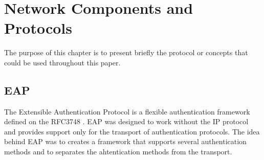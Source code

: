 
\chapter{Network Components and Protocols} %

\label{Chapter3} %


The purpose of this chapter is to present briefly the protocol or concepts that could be used throughout this paper.
\section{EAP}
The Extensible Authentication Protocol is a flexible authentication framework defined on the RFC3748 \cite{rfc3748}. EAP was designed to work without the IP protocol and provides support only for the transport of authentication protocols. The idea behind EAP was to creates a framework that supports several authentication methods and to separates the ahtentication methods from the transport.


